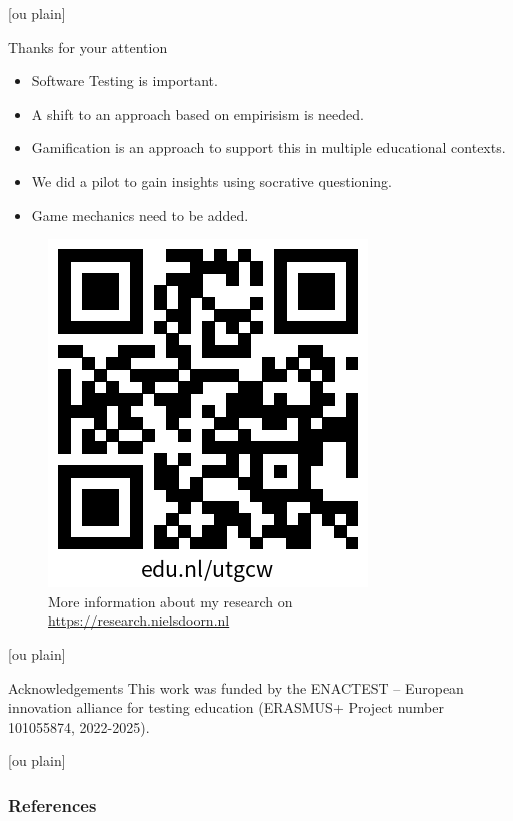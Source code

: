 \documentclass[aspectratio=169]{beamer}
\begin{document}
[ou plain]
\begin{frame}{Thanks for your attention}

\begin{itemize}
    \item Software Testing is important.
    \item A shift to an approach based on empirisism is needed.
    \item Gamification is an approach to support this in multiple educational contexts.
    \item We did a pilot to gain insights using socrative questioning.
    \item Game mechanics need to be added.
\end{itemize}


\begin{figure}
    \centering
    \includegraphics[width=0.25\linewidth]{images//qr.png}
    \caption{More information about my research on \url{https://research.nielsdoorn.nl}}
\end{figure}
\end{frame}

[ou plain]
\begin{frame}{Acknowledgements}
    This work was funded by the ENACTEST -- European innovation alliance for testing education (ERASMUS+ Project number 101055874, 2022-2025). %
\end{frame}

[ou plain]
\begin{frame}[allowframebreaks]
    \frametitle{References}
    \printbibliography
\end{frame}
\end{document}
